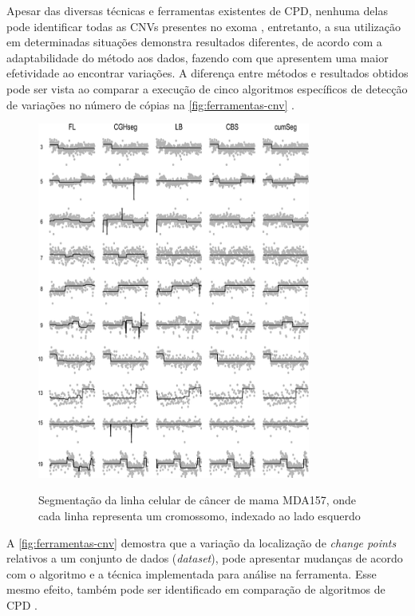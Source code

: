 Apesar das diversas técnicas e ferramentas existentes de CPD, nenhuma delas pode identificar todas as CNVs presentes no exoma \cite{Zhao2013}, entretanto, a sua utilização em determinadas situações demonstra resultados diferentes, de acordo com a adaptabilidade do método aos dados, fazendo com que apresentem uma maior efetividade ao encontrar variações. A diferença entre métodos e resultados obtidos pode ser vista ao comparar a execução de cinco algoritmos específicos de detecção de variações no número de cópias na \autoref{fig:ferramentas-cnv} \cite{Muggeo2010}.

\begin{figure}[!htb] 
\centering 
\caption{Segmentação da linha celular de câncer de mama MDA157, onde cada linha representa um cromossomo, indexado ao lado esquerdo} 
\includegraphics[width=0.8\textwidth]{./dados/figuras/ferramentas-cnv} 
\label{fig:ferramentas-cnv} 
\end{figure} 

A \autoref{fig:ferramentas-cnv} demostra que a variação da localização de \textit{change points} relativos a um conjunto de dados (\textit{dataset}), pode apresentar mudanças de acordo com o algoritmo e a técnica implementada para análise na ferramenta. Esse mesmo efeito, também pode ser identificado em comparação de algoritmos de CPD \cite{Ducre-Robitaille2003,Reeves2007}.

